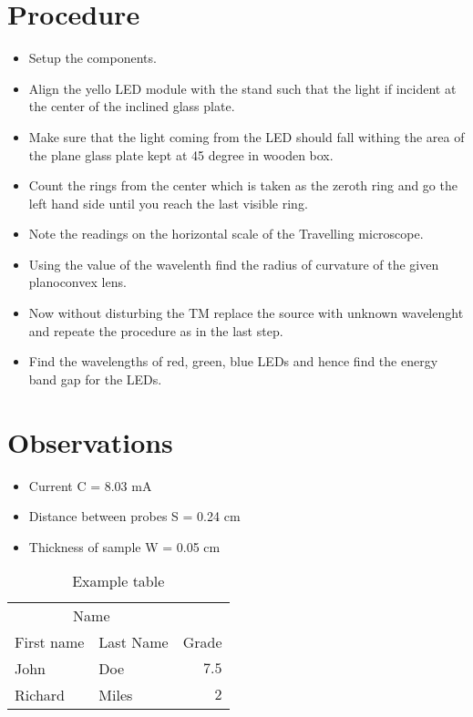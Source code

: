 \documentclass[twoside,twocolumn]{article}
\begin{document}

\section{Procedure}


\begin{itemize}
\item Setup the components.
\item Align the yello LED module with the stand such that the light if incident at the center of the inclined glass plate.
\item Make sure that the light coming from the LED should fall withing the area of the plane glass plate kept at 45 degree in wooden box. 
\item Count the rings from the center which is taken as the zeroth ring and go the left hand side until you reach the last visible ring. 
\item Note the readings on the horizontal scale of the Travelling microscope. 
\item Using the value of the wavelenth find the radius of curvature of the given planoconvex lens. 
\item Now without disturbing the TM replace the source with unknown wavelenght and repeate the procedure as in the last step. 
\item Find the wavelengths of red, green, blue LEDs and hence find the energy band gap for the LEDs. 
\end{itemize}


\section{Observations}

\begin{itemize}
\item Current C = 8.03 mA 
\item Distance between probes S = 0.24 cm
\item Thickness of sample W = 0.05 cm 
\end{itemize}
\begin{table}
\caption{Example table}
\centering
\begin{tabular}{llr}
\toprule
\multicolumn{2}{c}{Name} \\
\cmidrule(r){1-2}
First name & Last Name & Grade \\
\midrule
John & Doe & $7.5$ \\
Richard & Miles & $2$ \\
\bottomrule
\end{tabular}
\end{table}
\end{document}
